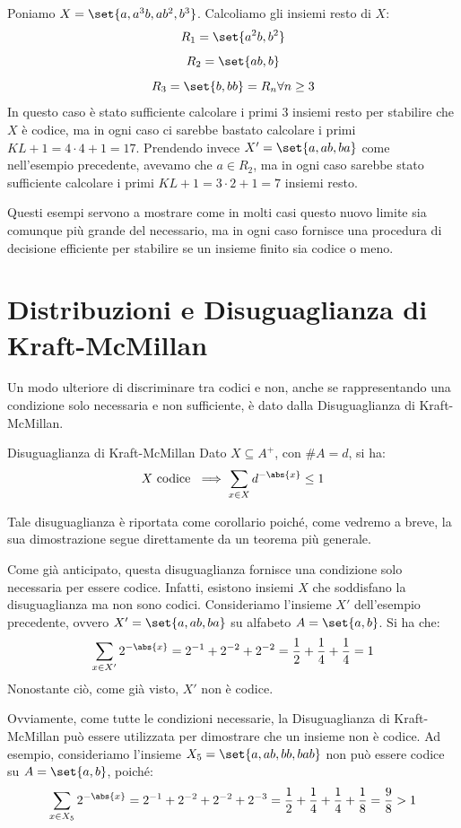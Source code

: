 \begin{example}{}
  Poniamo \(X = \set{a,a^3b,ab^2,b^3}\). Calcoliamo gli insiemi resto di \(X\):
  \[R_1 = \set{a^2b,b^2}\]
  \[R_2 = \set{ab,b}\]
  \[R_3 = \set{b,bb} = R_n \forall n \geq 3\]
  In questo caso è stato sufficiente calcolare i primi \(3\) insiemi resto per stabilire che \(X\) è codice, ma in ogni caso ci sarebbe bastato calcolare i primi \(KL+1 = 4\cdot 4 + 1 = 17\).
  Prendendo invece \(X' = \set{a,ab,ba}\) come nell'esempio precedente, avevamo che \(a \in R_2\), ma in ogni caso sarebbe stato sufficiente calcolare i primi \(KL+1 = 3\cdot 2 + 1 = 7\) insiemi resto.
\end{example}

Questi esempi servono a mostrare come in molti casi questo nuovo limite sia comunque più grande del necessario, ma in ogni caso fornisce una procedura di decisione efficiente per stabilire se un insieme finito sia codice o meno.

\section{Distribuzioni e Disuguaglianza di Kraft-McMillan}

Un modo ulteriore di discriminare tra codici e non, anche se rappresentando una condizione solo necessaria e non sufficiente, è dato dalla Disuguaglianza di Kraft-McMillan.
\begin{corollary}[namedlabel={cor:kraft-mcmillan_inequality}{Disuguaglianza di Kraft-McMillan}]{Disuguaglianza di Kraft-McMillan}
  Dato \(X \subseteq A^+\), con \(\# A = d\), si ha:
    \[X \text{ codice } \implies \sum_{x \in X} d^{-\abs{x}} \leq 1\]
\end{corollary}

Tale disuguaglianza è riportata come corollario poiché, come vedremo a breve, la sua dimostrazione segue direttamente da un teorema più generale.

\begin{example}[label=ex:kraft-mcmillan]{}
  Come già anticipato, questa disuguaglianza fornisce una condizione solo necessaria per essere codice. Infatti, esistono insiemi \(X\) che soddisfano la disuguaglianza ma non sono codici.
  Consideriamo l'insieme \(X'\) dell'esempio precedente, ovvero \(X' = \set{a,ab,ba}\) su alfabeto \(A = \set{a,b}\).
  Si ha che:
  \[\sum_{x \in X'} 2^{-\abs{x}}= 2^{-1} + 2^{-2} + 2^{-2} = \frac{1}{2} + \frac{1}{4} + \frac{1}{4} = 1\]
  Nonostante ciò, come già visto, \(X'\) non è codice.
  
  Ovviamente, come tutte le condizioni necessarie, la Disuguaglianza di Kraft-McMillan può essere utilizzata per dimostrare che un insieme non è codice.
  Ad esempio, consideriamo l'insieme \(X_5 = \set{a,ab,bb,bab}\) non può essere codice su \(A = \set{a,b}\), poiché:
  \[\sum_{x \in X_5} 2^{-\abs{x}}= 2^{-1} + 2^{-2} + 2^{-2} + 2^{-3} = \frac{1}{2} + \frac{1}{4} + \frac{1}{4} + \frac{1}{8} = \frac{9}{8} > 1\]
\end{example}

